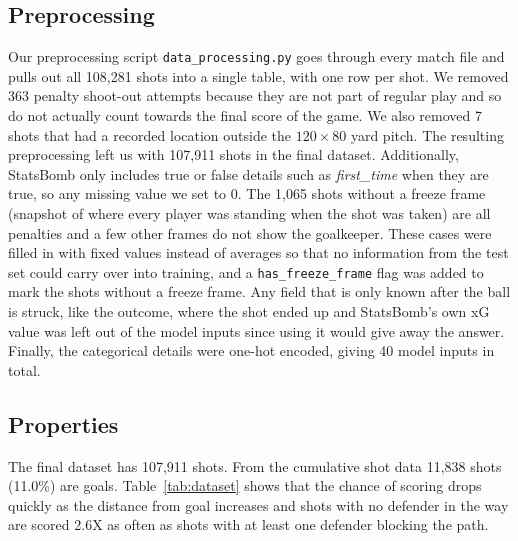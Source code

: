 \documentclass[11pt]{article}
\begin{document}
\subsection{Preprocessing}
Our preprocessing script \texttt{data\_processing.py} goes through every match file and pulls out all 108,281 shots into a single table, with one row per shot. We removed 363 penalty shoot-out attempts because they are not part of regular play and so do not actually count towards the final score of the game. We also removed 7 shots that had a recorded location outside the $120\times80$ yard pitch. The resulting preprocessing left us with 107,911 shots in the final dataset.
Additionally, StatsBomb only includes true or false details such as \textit{first\_time} when they are true, so any missing value we set to 0. The 1,065 shots without a freeze frame (snapshot of where every player was standing when the shot was taken) are all penalties and a few other frames do not show the goalkeeper. These cases were filled in with fixed values instead of averages so that no information from the test set could carry over into training, and a \texttt{has\_freeze\_frame} flag was added to mark the shots without a freeze frame. Any field that is only known after the ball is struck, like the outcome, where the shot ended up and StatsBomb's own xG value was left out of the model inputs since using it would give away the answer. Finally, the categorical details were one-hot encoded, giving 40 model inputs in total.

\subsection{Properties}
The final dataset has 107,911 shots. From the cumulative shot data 11,838 shots (11.0\%) are goals. Table~\ref{tab:dataset} shows that the chance of scoring drops quickly as the distance from goal increases and shots with no defender in the way are scored 2.6X as often as shots with at least one defender blocking the path.
\end{document}
